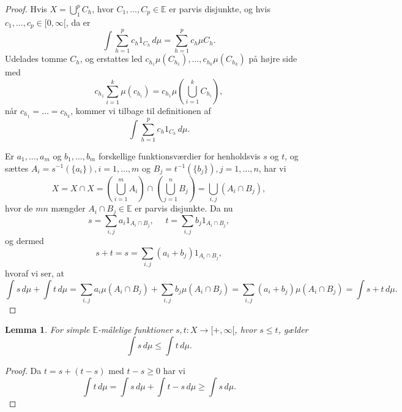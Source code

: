 \documentclass[12pt]{report}
\newtheorem{lemma}{Lemma}
\theoremstyle{break}
\newtheorem*{proof}{Bevis}
\theoremstyle{break}
\newcommand{\Int}[1]{\int#1\,d\mu}
\newcommand{\EE}{\mathbb{E}}
\newcommand{\1}{\mathds{1}}
\begin{document}
\begin{proof}
Hvis $X=\bigcup_1^pC_h$, hvor $C_1,\ldots,C_p\in\EE$ er parvis disjunkte, og hvis $c_1,\ldots,c_p\in[0,\infty[$, da er
\[\Int{\sum_{h=1}^pc_h1_{C_h}} = \sum_{h=1}^pc_h\mu{C_h}.\]
Udelades tomme $C_h$, og erstattes led $c_{h_1}\mu(C_{h_1}),\ldots,c_{h_k}\mu(C_{h_k})$ på højre side med
\[c_{h_1}\sum_{i=1}^{k}\mu(c_{h_i})=c_{h_1}\mu(\bigcup_{i=1}^kC_{h_i}),\]
når $c_{h_1}=\ldots=c_{h_k}$, kommer vi tilbage til definitionen af \[\Int{\sum_{h=1}^pc_h1_{C_h}}.\]

\bigskip

Er $a_1,\ldots,a_m$ og $b_1,\ldots,b_m$ forskellige funktionsværdier for henholdsvis $s$ og $t$, og sættes $A_i = s^{-1}(\{a_i\}), i=1,\ldots,m$ og $B_j = t^{-1}(\{b_j\}), j=1,\ldots,n$, har vi
\[X = X\cap X = \left(\bigcup_{i=1}^m A_i\right)\cap\left(\bigcup_{j=1}^n B_j\right) = \bigcup_{i,j} (A_i\cap B_j),\]
hvor de $mn$ mængder $A_i\cap B_j\in\EE$ er parvis disjunkte. Da nu
\[s=\sum_{i,j}a_i1_{A_i\cap B_j},~~~~~~t=\sum_{i,j}b_j1_{A_i\cap B_j},\]
og dermed
\[s+t = s=\sum_{i,j}(a_i+b_j)1_{A_i\cap B_j},\]
hvoraf vi ser, at 
\[\Int{s}+\Int{t}=\sum_{i,j}a_i\mu(A_i\cap B_j)+\sum_{i,j}b_j\mu(A_i\cap B_j) = \sum_{i,j}(a_i+b_j)\mu(A_i\cap B_j)=\Int{s+t}.\]
\end{proof}
\begin{lemma}
For simple $\EE$-målelige funktioner $s,t\colon X\to[+,\infty[$, hvor $s\leq t$, gælder
\[\Int{s}\leq\Int{t}.\]
\end{lemma}
\begin{proof}
Da $t=s+(t-s)$ med $t-s\geq 0$ har vi
\[\Int{t}=\Int{s}+\Int{t-s}\geq\Int{s}.\]
\end{proof}


\newpage
\end{document}
